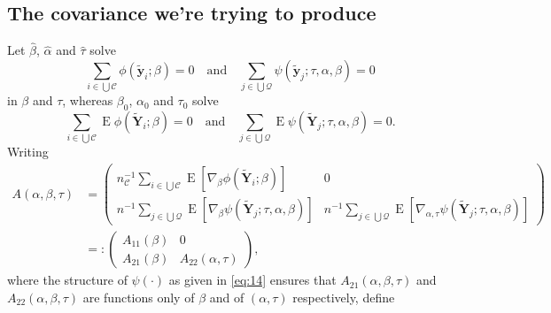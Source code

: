 \documentclass{article}
\newcommand{\EE}{\operatorname{E}}
\begin{document}
\subsection{The covariance we're trying to
  produce}\label{sec:covar-were-trying}

Let $\hat\beta$, $\hat\alpha$ and $\hat\tau$ solve
\[\sum_{i\in \bigcup \mathcal{C}}\phi(\tilde{\mathbf{y}}_{i}; \beta )
  =0\quad\text{and}\quad
\sum_{j\in \bigcup \mathcal{Q}}\psi(\tilde{\mathbf{y}}_{j}; \tau,
\alpha, \beta )  =0
  \]
  in $\beta$ and $\tau$, whereas $\beta_{0}$, $\alpha_{0}$ and $\tau_{0}$ solve 
\[\sum_{i\in \bigcup \mathcal{C}}\EE\phi(\tilde{\mathbf{Y}}_{i}; \beta )
  =0\quad\text{and}\quad
\sum_{j\in \bigcup \mathcal{Q}}\EE\psi(\tilde{\mathbf{Y}}_{j}; \tau,
\alpha, \beta )  =0.
  \]
  Writing
  \begin{align*}
    A(\alpha, \beta, \tau) &= \left(
      \begin{array}{cc}
        n_{\mathcal{C}}^{-1}\sum_{i\in \bigcup
        \mathcal{C}}\EE [\nabla_{\beta}\phi(\tilde{\mathbf{Y}}_{i};
        \beta )]&0\\
        n^{-1}\sum_{j\in \bigcup
        \mathcal{Q}}\EE[ \nabla_{\beta}\psi(\tilde{\mathbf{Y}}_{j};
        \tau, \alpha, \beta )]  & n^{-1}\sum_{j\in \bigcup
        \mathcal{Q}}\EE[ \nabla_{\alpha, \tau}\psi(\tilde{\mathbf{Y}}_{j};
        \tau, \alpha, \beta )]
      \end{array}
    \right)\\
    &=:\left(
      \begin{array}{cc}
        A_{11}(\beta)& 0\\
        A_{21}(\beta) & A_{22}(\alpha, \tau)
      \end{array}
\right),
  \end{align*}
where the structure of $\psi(\cdot)$ as given in \eqref{eq:14} ensures
that $A_{21}(\alpha, \beta, \tau)$ and $A_{22}(\alpha, \beta, \tau)$ are functions only of $\beta$ and of $(\alpha, \tau)$ respectively,
  define 
\end{document}
